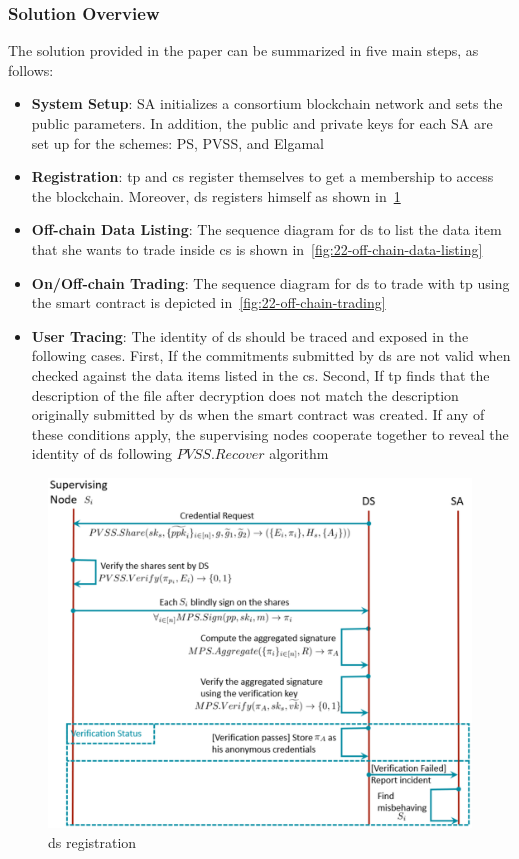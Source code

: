 \subsubsection{Solution Overview}
The solution provided in the paper can be summarized in five main steps, as follows:

\begin{itemize}
    \item \textbf{System Setup}: SA initializes a consortium blockchain network and sets the public parameters. 
    In addition, the public and private keys for each SA are set up for the schemes: PS, PVSS, and Elgamal
    \item \textbf{Registration}: \ac{tp} and \ac{cs} register themselves to get a membership to access the blockchain.
    Moreover, \ac{ds} registers himself as shown in~\cref{fig:22-ds-registration}
    \item \textbf{Off-chain Data Listing}: The sequence diagram for \ac{ds} to list the data item that she wants to trade inside \ac{cs} is shown in~\cref{fig:22-off-chain-data-listing}
    \item \textbf{On/Off-chain Trading}: The sequence diagram for \ac{ds} to trade with \ac{tp} using the smart contract is depicted in~\cref{fig:22-off-chain-trading}
    \item \textbf{User Tracing}: The identity of \ac{ds} should be traced and exposed in the following cases.
    First, If the commitments submitted by \ac{ds} are not valid when checked against the data items listed in the \ac{cs}.
    Second, If \ac{tp} finds that the description of the file after decryption does not match the description originally submitted by \ac{ds} when the smart contract was created.
    If any of these conditions apply, the supervising nodes cooperate together to reveal the identity of \ac{ds} following $PVSS.Recover$ algorithm
\end{itemize}

\begin{figure}
\centering
  \includegraphics[width=1\linewidth]{imgs/22-sequenceRegisterDs.eps}
  \caption{\ac{ds} registration}
  \label{fig:22-ds-registration}
\end{figure}

